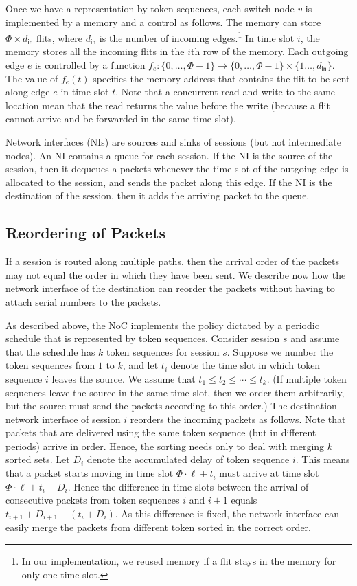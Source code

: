 \documentclass[a4paper,12pt]{article}
\newenvironment{proof sketch}[1]{\noindent {\emph{Proof sketch of #1:}}}{\hfill \qed}
\newcommand{\inn}{\mathsf{in}}
\newcommand{\din}{d_{\inn}}
\begin{document}
Once we have a representation by token sequences, each switch node $v$ is implemented
by a memory and a control as follows. The memory can store $\Phi\times \din$ flits,
where $\din$ is the number of incoming edges.\footnote{In our implementation, we
  reused memory if a flit stays in the memory for only one time slot.} In time slot $i$, the memory stores all
the incoming flits in the $i$th row of the memory. Each outgoing edge $e$ is
controlled by a function $f_e : \{0,\ldots,\Phi-1\} \rightarrow \{0,\ldots,
\Phi-1\}\times \{1\ldots,\din\}$. The value of $f_e(t)$ specifies the memory address 
that contains the flit to be sent along edge $e$ in time slot $t$. Note that a
concurrent read and write to the same location mean that the read returns the value
before the write (because a flit cannot arrive and be forwarded in the same time
slot).

Network interfaces (NIs) are sources and sinks of sessions (but not intermediate
nodes).  An NI contains a queue for each session. If the NI is the source of the
session, then it dequeues a packets whenever the time slot of the outgoing edge is
allocated to the session, and sends the packet along this edge. If the NI is the destination
of the session, then it adds the arriving packet to the queue.

\subsection{Reordering of Packets}
If a session is routed along multiple paths, then the arrival order of the packets
may not equal the order in which they have been sent. We describe now how the network
interface of the destination can reorder the packets without having to attach serial
numbers to the packets.

As described above, the NoC implements the policy dictated by a periodic schedule
that is represented by token sequences.  Consider session $s$ and assume that the
schedule has $k$ token sequences for session $s$. Suppose we number the token
sequences from $1$ to $k$, and let $t_i$ denote the time slot in which token sequence
$i$ leaves the source. We assume that $t_1\leq t_2\leq \cdots \leq t_k$.  (If
multiple token sequences leave the source in the same time slot, then we order them
arbitrarily, but the source must send the packets according to this order.)  The
destination network interface of session $i$ reorders the incoming packets as
follows.  Note that packets that are delivered using the same token sequence (but in
different periods) arrive in order.  Hence, the sorting needs only to deal with
merging $k$ sorted sets.  Let $D_i$ denote the accumulated delay of token sequence
$i$. This means that a packet starts moving in time slot $\Phi\cdot \ell +t_i$ must
arrive at time slot $\Phi\cdot \ell +t_i +D_i$.  Hence the difference in time slots
between the arrival of consecutive packets from token sequences $i$ and $i+1$ equals
$t_{i+1}+D_{i+1} - (t_i+D_i)$. As this difference is fixed, the network interface
can easily merge the packets from different token sorted in the correct order.
\end{document}
